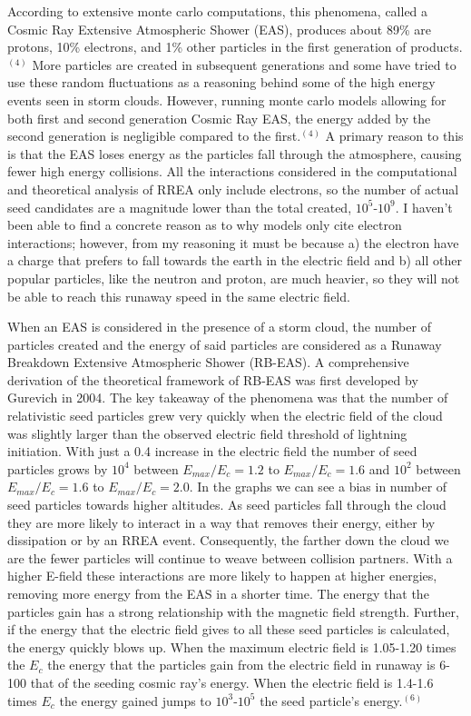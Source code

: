 \documentclass[11pt]{article}
\begin{document}
\begin{multicols*}{2}
    According to extensive monte carlo computations, this phenomena, called a Cosmic Ray Extensive Atmospheric Shower (EAS), produces about 89\% are protons, 10\% electrons, and 1\% other particles in the first generation of products.$^{(4)}$ More particles are created in subsequent generations and some have tried to use these random fluctuations as a reasoning behind some of the high energy events seen in storm clouds. However, running monte carlo models allowing for both first and second generation Cosmic Ray EAS, the energy added by the second generation is negligible compared to the first.$^{(4)}$ A primary reason to this is that the EAS loses energy as the particles fall through the atmosphere, causing fewer high energy collisions. All the interactions considered in the computational and theoretical analysis of RREA only include electrons, so the number of actual seed candidates are a magnitude lower than the total created, $10^5$-$10^9$. I haven't been able to find a concrete reason as to why models only cite electron interactions; however, from my reasoning it must be because a) the electron have a charge that prefers to fall towards the earth in the electric field and b) all other popular particles, like the neutron and proton, are much heavier, so they will not be able to reach this runaway speed in the same electric field. 
    
    When an EAS is considered in the presence of a storm cloud, the number of particles created and the energy of said particles are considered as a Runaway Breakdown Extensive Atmospheric Shower (RB-EAS). A comprehensive derivation of the theoretical framework of RB-EAS was first developed by Gurevich in 2004. The key takeaway of the phenomena was that the number of relativistic seed particles grew very quickly when the electric field of the cloud was slightly larger than the observed electric field threshold of lightning initiation. With just a 0.4 increase in the electric field the number of seed particles grows by $10^4$ between $E_{max}/E_c =1.2$ to $E_{max}/E_c =1.6$ and $10^2$ between $E_{max}/E_c =1.6$ to $E_{max}/E_c =2.0$. In the graphs we can see a bias in number of seed particles towards higher altitudes. As seed particles fall through the cloud they are more likely to interact in a way that removes their energy, either by dissipation or by an RREA event. Consequently, the farther down the cloud we are the fewer particles will continue to weave between collision partners. With a higher E-field these interactions are more likely to happen at higher energies, removing more energy from the EAS in a shorter time. The energy that the particles gain has a strong relationship with the magnetic field strength. Further, if the energy that the electric field gives to all these seed particles is calculated, the energy quickly blows up.  When the maximum electric field is 1.05-1.20 times the $E_c$ the energy that the particles gain from the electric field in runaway is 6-100 that of the seeding cosmic ray's energy. When the electric field is 1.4-1.6 times $E_c$ the energy gained jumps to $10^3$-$10^5$ the seed particle's energy.$^{(6)}$
        

\end{multicols*}
\end{document}
